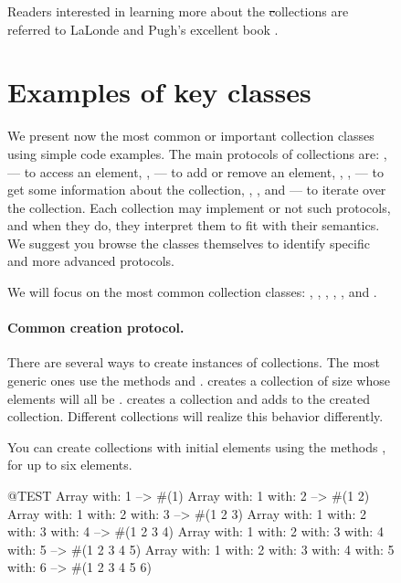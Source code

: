 \documentclass[a4paper,10pt,twoside]{book}
\begin{document}
\begin{figure}
\begin{center}
Readers interested in learning more about the \st collections are referred to LaLonde and Pugh's excellent book \cite{LaLo90a}.

\section{Examples of key classes}
We present now the most common or important collection classes using simple code examples. 
The main protocols of collections are: ,  --- to access an element, ,  --- to add or remove an element, , ,  --- to get some information about the collection, , , and  --- to iterate over the collection. 
Each collection may implement or not such protocols, and when they do, they interpret them to fit with their semantics.
We suggest you browse the classes themselves to identify specific and more advanced protocols.

We will focus on the most common collection classes: , , , , , and .

\paragraph{Common creation protocol.}
There are several ways to create instances of collections.
The most generic ones use the methods  and .
 creates a collection of size  whose elements will all be .
  creates a collection and adds  to the created collection.
Different collections will realize this behavior differently.

You can create collections with initial elements using the methods ,  \etc for up to six elements.

\begin{code}{@TEST}
Array with: 1 --> #(1)
Array with: 1 with: 2 --> #(1 2)
Array with: 1 with: 2 with: 3 --> #(1 2 3)
Array with: 1 with: 2 with: 3 with: 4 --> #(1 2 3 4)
Array with: 1 with: 2 with: 3 with: 4 with: 5 --> #(1 2 3 4 5)
Array with: 1 with: 2 with: 3 with: 4 with: 5 with: 6 --> #(1 2 3 4 5 6)
\end{code}


\end{center}
\end{figure}
\end{document}
